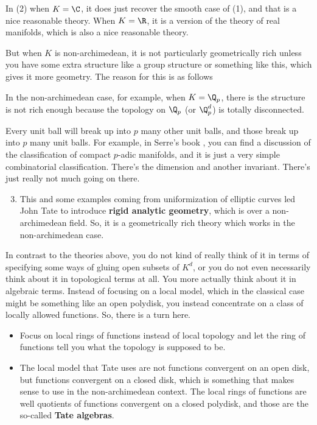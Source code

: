 In (2) when $K = \C$, it does just recover the smooth case of (1), and that is  a nice reasonable theory. When $K = \R$, it is a 
version of the theory of real manifolds, which is also a nice reasonable theory. 

But when $K$ is non-archimedean, it is not particularly geometrically rich unless you have some extra structure like a group 
structure or something like this, which gives it more geometry. The reason for this is as follows 



In the non-archimedean case, for example, when $K=\Q_p$, there is the structure is not rich enough because the topology 
on $\Q_p$ (or $\Q_p^d$) is totally disconnected.

\begin{remark}
    Every unit ball will break up into $p$ many other unit balls, and those break up into $p$ many unit balls. For example, in 
    Serre's book \citeme{}, you can find a discussion of the classification of compact $p$-adic manifolds, and it is just a very 
    simple combinatorial classification. There's the dimension and another invariant. There's just really not much going on there.
\end{remark}
    
\begin{enumerate}
    \setcounter{enumi}{2} 
    
    \item  This and some examples coming from uniformization of elliptic curves led John Tate \citeme{} to introduce 
    \textbf{rigid analytic geometry}, which is over a non-archimedean field. So, it is a geometrically rich theory which 
    works in the non-archimedean case. 
\end{enumerate}



In contrast to the theories above, you do not kind of really think of it in terms of specifying some ways of gluing open subsets 
of $K^{d}$, or you do not even necessarily think about it in topological terms at all. You more actually think about it in algebraic 
terms. Instead of focusing on a local model, which in the classical case might be something like an open polydisk, you instead 
concentrate on a class of locally allowed functions. So, there is a turn here. 

\begin{itemize}
    \item Focus on local rings of functions instead of local topology and let the ring of functions tell you what the topology is 
    supposed to be.

    \item The local model that Tate uses are not functions convergent on an open disk, but functions convergent on a closed disk, 
    which is something that makes sense to use in the non-archimedean context. The local rings of functions are well quotients of 
    functions convergent on a closed polydisk, and those are the so-called \textbf{Tate algebras}.
\end{itemize}

